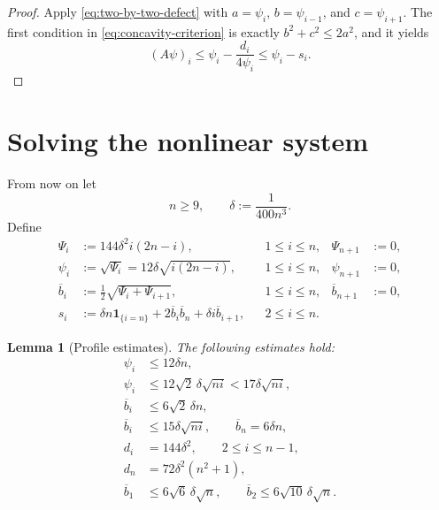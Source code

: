 \documentclass[11pt]{amsart}
\numberwithin{equation}{section}
\newtheorem{lemma}[lemma]{Lemma}
\theoremstyle{remark}
\newcommand{\ind}[1]{\mathbf 1_{\{#1\}}}
\begin{document}
\begin{proof}
Apply \eqref{eq:two-by-two-defect} with
$a=\psi_i$, $b=\psi_{i-1}$, and $c=\psi_{i+1}$.  The first condition in
\eqref{eq:concavity-criterion} is exactly
$b^2+c^2\leq2a^2$, and it yields
\[
 (A\psi)_i\leq\psi_i-\frac{d_i}{4\psi_i}
 \leq\psi_i-s_i.
\]
\end{proof}

\section{Solving the nonlinear system}

From now on let
\begin{equation}\label{eq:delta-choice}
 n\geq9,
 \qquad
 \delta:=\frac1{400n^3}.
\end{equation}
Define
\begin{align}
 \Psi_i&:=144\delta^2 i(2n-i),
 &&1\leq i\leq n,
 &\Psi_{n+1}&:=0,
 \label{eq:Psi-profile}\\
 \psi_i&:=\sqrt{\Psi_i}
 =12\delta\sqrt{i(2n-i)},
 &&1\leq i\leq n,
 &\psi_{n+1}&:=0,
 \label{eq:psi-profile}\\
 \overline b_i&:=\frac12\sqrt{\Psi_i+\Psi_{i+1}},
 &&1\leq i\leq n,
 &\overline b_{n+1}&:=0,
 \label{eq:bbar}\\
 s_i&:=\delta n\ind{i=n}
 +2\overline b_i\overline b_n
 +\delta i\overline b_{i+1},
 &&2\leq i\leq n.
 \label{eq:s-def}
\end{align}

\begin{lemma}[Profile estimates]\label{lem:profile-estimates}
The following estimates hold:
\begin{align}
 \psi_i&\leq12\delta n,
 \label{eq:profile-p1}\\
 \psi_i&\leq12\sqrt2\,\delta\sqrt{ni}
 <17\delta\sqrt{ni},
 \label{eq:profile-p2}\\
 \overline b_i&\leq6\sqrt2\,\delta n,
 \label{eq:profile-p3}\\
 \overline b_i&\leq15\delta\sqrt{ni},
 \qquad
 \overline b_n=6\delta n,
 \label{eq:profile-p4}\\
 d_i&=144\delta^2,
 \qquad 2\leq i\leq n-1,
 \label{eq:profile-p5a}\\
 d_n&=72\delta^2(n^2+1),
 \label{eq:profile-p5b}\\
 \overline b_1&\leq6\sqrt6\,\delta\sqrt n,
 \qquad
 \overline b_2\leq6\sqrt{10}\,\delta\sqrt n.
 \label{eq:profile-p6}
\end{align}
\end{lemma}
\end{document}
